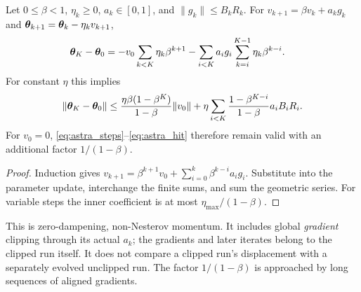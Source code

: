 \begin{lemma}
\label{lem:astra_momentum}
Let $0\le\beta<1$, $\eta_k\ge0$, $a_k\in[0,1]$, and
$\|g_k\|\le B_kR_k$. For
$v_{k+1}=\beta v_k+a_kg_k$ and
${\boldsymbol{\theta}}_{k+1}={\boldsymbol{\theta}}_k-\eta_kv_{k+1}$,
\begin{align}
 {\boldsymbol{\theta}}_K-{\boldsymbol{\theta}}_0
 &=-v_0\sum_{k<K}\eta_k\beta^{k+1}
   -\sum_{i<K}a_ig_i\sum_{k=i}^{K-1}\eta_k\beta^{k-i}.
 \label{eq:astra_momentum_exact}
\end{align}
For constant $\eta$ this implies
\begin{equation}\label{eq:astra_momentum}
 \|{\boldsymbol{\theta}}_K-{\boldsymbol{\theta}}_0\|\le
 \frac{\eta\beta(1-\beta^K)}{1-\beta}\|v_0\|
 +\eta\sum_{i<K}\frac{1-\beta^{K-i}}{1-\beta}a_iB_iR_i.
\end{equation}
For $v_0=0$, \eqref{eq:astra_steps}--\eqref{eq:astra_hit} therefore
remain valid with an additional factor $1/(1-\beta)$.
\end{lemma}
\begin{proof}
Induction gives $v_{k+1}=\beta^{k+1}v_0+
\sum_{i=0}^k\beta^{k-i}a_ig_i$. Substitute into the parameter update,
interchange the finite sums, and sum the geometric series. For variable
steps the inner coefficient is at most $\eta_{\max}/(1-\beta)$.
\end{proof}
\begin{remark}
This is zero-dampening, non-Nesterov momentum. It includes global
\emph{gradient} clipping through its actual $a_k$; the gradients and
later iterates belong to the clipped run itself. It does not compare
a clipped run's displacement with a separately evolved unclipped run.
The factor $1/(1-\beta)$ is approached by long sequences of aligned gradients.
\end{remark}

